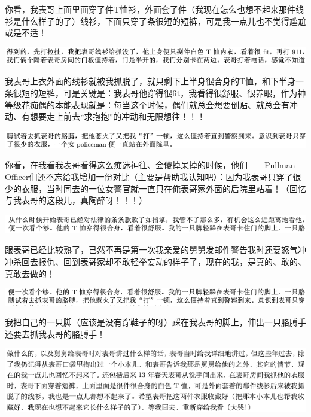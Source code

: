 \documentclass[9pt, b5paper]{article}
\begin{document}
你看，我表哥上面里面穿了件T恤衫，外面套了件（我现在怎么也想不起来那件线衫是什么样子的了）线衫，下面只穿了条很短的短裤，可是我一点儿也不觉得尴尬或是不适！

\begin{center}
\includegraphics[width=.9\linewidth]{./pic/backups_plans_20210502_112432.png}
\end{center}

我表哥上衣外面的线衫就被我抓脱了，就只剩下上半身很合身的T恤，和下半身一条很短的短裤，可是关键是：我表哥他穿得很fit，我看得很舒服、很养眼，作为神等级花痴偶的本能表现就是：每当这个时候，偶们就总会想要倒贴、就总会有冲动、有想要走上前去“求抱抱”的冲动和无限想往！！！

\begin{center}
\includegraphics[width=.9\linewidth]{./pic/backups_plans_20210502_113425.png}
\end{center}

你看，在我看我表哥看得这么痴迷神往、会傻掉呆掉的时候，他们——Pullman Officer们还不忘给我增加一份对比（主要是帮助我认知吧）：因为我表哥只穿了很少的衣服，当时同去的一位女警官就一直只在俺表哥家外面的后院里站着！（回忆与我表哥的这段儿，真陶醉呀！！！）

\begin{center}
\includegraphics[width=.9\linewidth]{./pic/backups_plans_20210502_113127.png}
\end{center}

跟表哥已经比较熟了，已然不再是第一次我亲爱的舅舅发邮件警告我时还要怒气冲冲杀回去报仇、回到表哥家却不敢轻举妄动的样子了，现在的我，是真的、敢的、真敢去做的！

\begin{center}
\includegraphics[width=.9\linewidth]{./pic/backups_plans_20210502_113101.png}
\end{center}

我把自己的一只脚（应该是没有穿鞋子的呀）踩在我表哥的脚上，伸出一只胳膊手还要去抓我表哥的胳膊手！

\begin{center}
\includegraphics[width=.9\linewidth]{./pic/backups_plans_20210502_104225.png}
\end{center}
\end{document}
